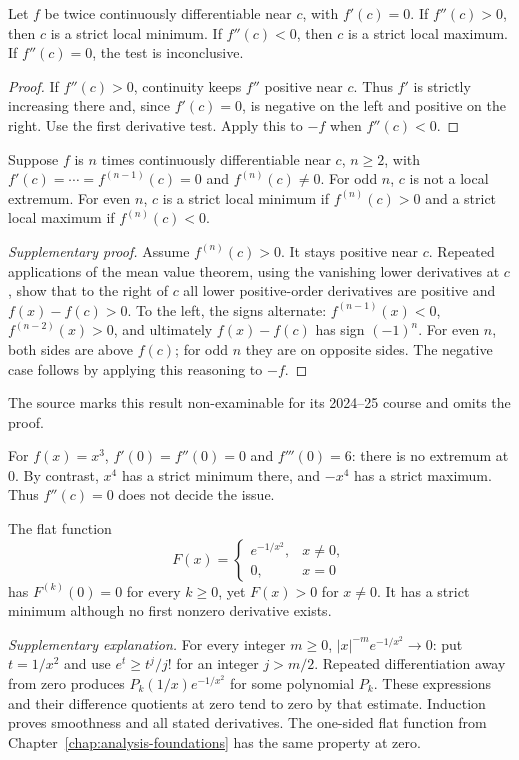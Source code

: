 \begin{theorem}
Let $f$ be twice continuously differentiable near $c$, with $f'(c)=0$.
If $f''(c)>0$, then $c$ is a strict local minimum. If $f''(c)<0$, then
$c$ is a strict local maximum. If $f''(c)=0$, the test is inconclusive.
\end{theorem}
\begin{proof}
If $f''(c)>0$, continuity keeps $f''$ positive near $c$. Thus $f'$ is
strictly increasing there and, since $f'(c)=0$, is negative on the left
and positive on the right. Use the first derivative test.
Apply this to $-f$ when $f''(c)<0$.
\end{proof}

\begin{theorem}
Suppose $f$ is $n$ times continuously differentiable near $c$, $n\geq2$,
with $f'(c)=\cdots=f^{(n-1)}(c)=0$ and $f^{(n)}(c)\ne0$.
For odd $n$, $c$ is not a local extremum.
For even $n$, $c$ is a strict local minimum if $f^{(n)}(c)>0$ and a
strict local maximum if $f^{(n)}(c)<0$.
\end{theorem}
\begin{proof}[Supplementary proof]
Assume $f^{(n)}(c)>0$. It stays positive near $c$.
Repeated applications of the mean value theorem, using the vanishing
lower derivatives at $c$, show that to the right of $c$ all lower
positive-order derivatives are positive and $f(x)-f(c)>0$.
To the left, the signs alternate: $f^{(n-1)}(x)<0$,
$f^{(n-2)}(x)>0$, and ultimately $f(x)-f(c)$ has sign $(-1)^n$.
For even $n$, both sides are above $f(c)$; for odd $n$ they are on opposite
sides. The negative case follows by applying this reasoning to $-f$.
\end{proof}
The source marks this result non-examinable for its 2024--25 course and
omits the proof.

\begin{example}
For $f(x)=x^3$, $f'(0)=f''(0)=0$ and $f'''(0)=6$: there is no extremum at
$0$. By contrast, $x^4$ has a strict minimum there, and $-x^4$ has a strict
maximum. Thus $f''(c)=0$ does not decide the issue.

The flat function
\[
F(x)=\begin{cases}e^{-1/x^2},&x\ne0,\\0,&x=0\end{cases}
\]
has $F^{(k)}(0)=0$ for every $k\geq0$, yet $F(x)>0$ for $x\ne0$.
It has a strict minimum although no first nonzero derivative exists.

\textit{Supplementary explanation.} For every integer $m\geq0$,
$|x|^{-m}e^{-1/x^2}\to0$: put $t=1/x^2$ and use $e^t\geq t^j/j!$ for
an integer $j>m/2$. Repeated differentiation away from zero produces
$P_k(1/x)e^{-1/x^2}$ for some polynomial $P_k$. These expressions and their
difference quotients at zero tend to zero by that estimate. Induction
proves smoothness and all stated derivatives. The one-sided flat function
from Chapter~\ref{chap:analysis-foundations} has the same property at zero.
\end{example}

